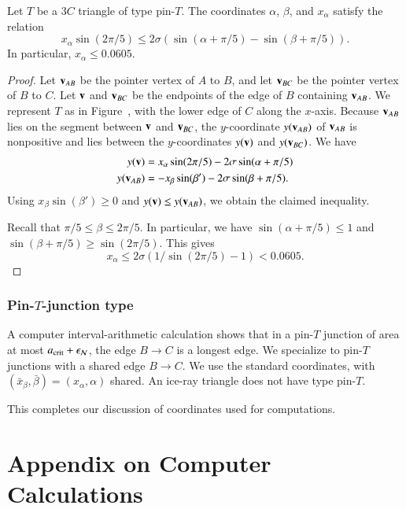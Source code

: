 \begin{lemma}
  Let $T$ be a $3C$ triangle of type pin-$T$.  The coordinates
  $\alpha$, $\beta$, and $x_\alpha$ satisfy the relation
\[
x_\alpha \sin(2\pi/5) \le 2\sigma (\sin(\alpha+\pi/5) - \sin(\beta+\pi/5)).
\]
In particular, $x_\alpha \le 0.0605$.
\end{lemma}

\begin{proof} Let ${\mathbf v}_{AB}$ be the pointer vertex of $A$ to $B$, and
  let ${\mathbf v}_{BC}$ be the pointer vertex of $B$ to $C$.  Let ${\mathbf v}$ and
  ${\mathbf v}_{BC}$ be the endpoints of the edge of $B$ containing ${\mathbf v}_{AB}$.
  We represent $T$ as in Figure~, with the lower edge of
  $C$ along the $x$-axis.  Because ${\mathbf v}_{AB}$ lies on the segment between
  ${\mathbf v}$ and ${\mathbf v}_{BC}$, the $y$-coordinate $y({\mathbf v}_{AB})$ of ${\mathbf v}_{AB}$ is
  nonpositive and lies between the $y$-coordinates $y({\mathbf v})$ and
  $y({\mathbf v}_{BC})$.  We have
\begin{align*}
y({\mathbf v}) &= x_\alpha \sin(2\pi/5) - 2\sigma\sin(\alpha+\pi/5)\\
y({\mathbf v}_{AB}) & = -x_\beta \sin(\beta') - 2\sigma\sin(\beta+\pi/5).
\end{align*}
Using $x_\beta \sin(\beta')\ge 0$ and $y({\mathbf v}) \le y({\mathbf v}_{AB})$, we
obtain the claimed inequality.

Recall that $\pi/5\le \beta \le 2\pi/5$.  In particular, we have
$\sin(\alpha+\pi/5) \le 1$ and $\sin(\beta+\pi/5)\ge \sin(2\pi/5)$.
This gives
\[
x_\alpha \le 2\sigma(1/\sin(2\pi/5) - 1) < 0.0605.
\]
\end{proof}

\subsubsection{Pin-$T$-junction type}

A computer interval-arithmetic calculation
shows that in a pin-$T$ junction of area at most $a_\text{crit}+\epsilon_{\mathcal N}$, the edge $B\to C$ is a longest edge.  We specialize to
pin-$T$ junctions with a shared edge $B\to C$.  We use the standard
coordinates, with $(\bar x_\beta,\bar\beta)=(x_\alpha,\alpha)$ shared.
An ice-ray triangle does not have type pin-$T$.

This completes our discussion of coordinates used for computations.

\section{Appendix on Computer Calculations}


